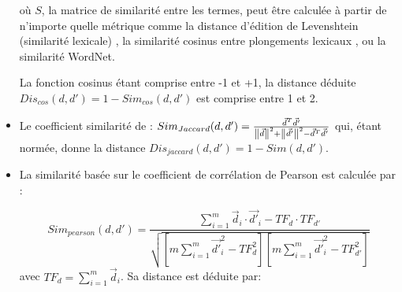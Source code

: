 \begin{itemize}
	où $S$, la matrice de similarité entre les termes, peut être calculée à partir de n'importe quelle métrique comme la distance d'édition de Levenshtein (similarité lexicale) \citep{sidorov2014softcosine},  la similarité cosinus entre  plongements lexicaux \citep{charlet2017simbow_acl, charlet2017simbow_tal}, ou la similarité WordNet.
	
	La fonction cosinus  étant comprise entre -1 et +1, la distance déduite $Dis_{cos}(d,d') = 1 - Sim_{cos}(d,d')$ est comprise entre 1 et 2.
	
	\item Le coefficient similarité de \cite{jaccard1901similarite-jaccard}: $Sim_{Jaccard}(d,d') = \frac{\vec{d}^T\vec{d'}}{\left\lVert\vec{d}\right\rVert^2+\left\lVert\vec{d'}\right\rVert^2 - \vec{d}^T\vec{d'}}$ \citep{huang2008similarityTextClustering} qui, étant normée, donne la distance $Dis_{jaccard}(d,d') = 1-Sim(d,d')$.
	\item La similarité basée sur le coefficient de corrélation de Pearson est calculée par \citep{huang2008similarityTextClustering}:
	
	\[Sim_{pearson}(d,d') = \frac{ \sum\limits^m_{i=1} \vec{d}_i \cdot \vec{d'}_i - TF_d\cdot TF_{d'}}{\sqrt{[m \sum\limits^m_{i=1} \vec{d'}_i^2 - TF^2_d][m \sum\limits^m_{i=1} \vec{d'}_i^2 - TF^2_{d'}]}}\]
avec $TF_d = \sum\limits^m_{i=1} \vec{d}_i$. Sa distance est déduite par:


\end{itemize}
